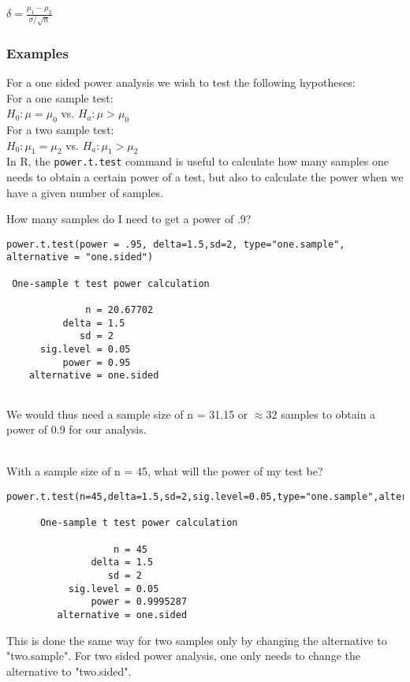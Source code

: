 \documentclass[12pt,a4paper]{article}
\theoremstyle{regla}
\theoremstyle{remark}
\theoremstyle{definition}
\theoremstyle{nonumberbreak}
\begin{document}
$\delta = \frac{\mu_1-\mu_2}{\sigma/\sqrt{n}}$
\subsubsection{Examples}
\begin{xmpl}
For a one sided power analysis we wish to test the following hypotheses:\\

For a one sample test:\\
$H_0: \mu = \mu_0$ vs. $H_a: \mu > \mu_0$\\

For a two sample test:\\
$H_0: \mu_1 = \mu_2$ vs. $H_a: \mu_1 > \mu_2$\\

In R, the \texttt{power.t.test} command is useful to calculate how many samples one needs to obtain
a certain power of a test, but also to calculate the power when we have a given number of samples.
\end{xmpl}
\begin{xmpl}
How many samples do I need to get a power of .9?
\begin{lstlisting}
power.t.test(power = .95, delta=1.5,sd=2, type="one.sample", alternative = "one.sided")

 One-sample t test power calculation 

              n = 20.67702
          delta = 1.5
             sd = 2
      sig.level = 0.05
          power = 0.95
    alternative = one.sided
    
\end{lstlisting}
We would thus need a sample size of n = 31.15 or $\approx 32$ samples to obtain a power of 0.9 for
our analysis.\\~
\end{xmpl}
\begin{xmpl}
With a sample size of n = 45, what will the power of my test be?\\

\begin{lstlisting}
power.t.test(n=45,delta=1.5,sd=2,sig.level=0.05,type="one.sample",alternative="one.sided")

      One-sample t test power calculation 
     
                   n = 45
               delta = 1.5
                  sd = 2
           sig.level = 0.05
               power = 0.9995287
         alternative = one.sided

\end{lstlisting}

This is done the same way for two samples only by changing the alternative to "two.sample". For two sided power analysis, one only needs to change the alternative to "two.sided".\\~
\end{xmpl}
\end{document}
